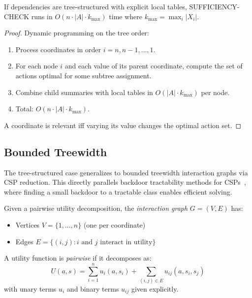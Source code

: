 \begin{theorem}\label{thm:tree-struct}
If dependencies are tree-structured with explicit local tables, SUFFICIENCY-CHECK runs in $O(n \cdot |A| \cdot k_{\max})$ time where $k_{\max} = \max_i |X_i|$.
\end{theorem}


\begin{proof}
Dynamic programming on the tree order:
\begin{enumerate}
\item Process coordinates in order $i = n, n-1, \ldots, 1$.
\item For each node $i$ and each value of its parent coordinate, compute the set of actions optimal for some subtree assignment.
\item Combine child summaries with local tables in $O(|A| \cdot k_{\max})$ per node.
\item Total: $O(n \cdot |A| \cdot k_{\max})$.
\end{enumerate}
A coordinate is relevant iff varying its value changes the optimal action set.
\end{proof}

\subsection{Bounded Treewidth}\label{sec:tract-treewidth}
 
The tree-structured case generalizes to bounded treewidth interaction graphs via CSP reduction. This directly parallels backdoor tractability methods for CSPs~\cite{bessiere2013detecting}, where finding a small backdoor to a tractable class enables efficient solving.

\begin{definition}\label{def:interaction-graph}
Given a pairwise utility decomposition, the \emph{interaction graph} $G = (V, E)$ has:
\begin{itemize}
\item Vertices $V = \{1, \ldots, n\}$ (one per coordinate)
\item Edges $E = \{(i, j) : i \text{ and } j \text{ interact in } \text{utility}\}$
\end{itemize}
\end{definition}

\begin{definition}\label{def:pairwise}
A utility function is \emph{pairwise} if it decomposes as:
\[
U(a, s) = \sum_{i=1}^n u_i(a, s_i) + \sum_{(i,j) \in E} u_{ij}(a, s_i, s_j)
\]
with unary terms $u_i$ and binary terms $u_{ij}$ given explicitly.
\end{definition}

